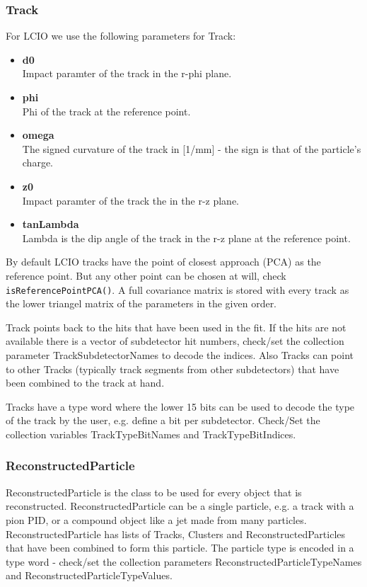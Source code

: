 \documentclass[twoside]{article}
\begin{document}
\subsubsection{Track}
For LCIO we use the following parameters for Track:
\begin{itemize}
\item{{\bf d0}\\
Impact paramter of the track in the r-phi plane.}
\item{{\bf phi}\\
Phi of the track at the reference point.}
\item{{\bf omega}\\
The signed curvature of the track in [1/mm] - the sign is that of the particle's charge.
}
\item{{\bf z0}\\
Impact paramter of the track the in the r-z plane.
}
\item{{\bf tanLambda}\\
Lambda is the dip angle of the track in the r-z plane at the reference point. 
}
\end{itemize}
By default LCIO tracks have the point of closest approach (PCA) as the reference point. But any other point can 
be chosen at will, check \verb$isReferencePointPCA()$.  A full covariance matrix is stored with every track as the
lower triangel matrix of the parameters in the given order.

Track points back to the hits that have been used in the  fit. 
If the hits are not available there is a vector of subdetector hit numbers, check/set the collection parameter
TrackSubdetectorNames to decode the indices. Also Tracks can point to other Tracks (typically track segments from
other subdetectors) that have been combined to the track at hand.

Tracks have a type word where the lower 15 bits can be used to decode the type of the track by the
user, e.g. define a bit per subdetector. Check/Set the collection variables TrackTypeBitNames and 
TrackTypeBitIndices.

\subsubsection{ReconstructedParticle}
ReconstructedParticle is the class to be used for every object that is reconstructed. ReconstructedParticle can be
a single particle, e.g. a track with a pion PID, or a compound object like a jet made from many particles.
ReconstructedParticle has lists of Tracks, Clusters and ReconstructedParticles that have been combined to form 
this particle. The particle type  is encoded  in a type word - check/set the collection parameters 
ReconstructedParticleTypeNames and ReconstructedParticleTypeValues.
\end{document}
